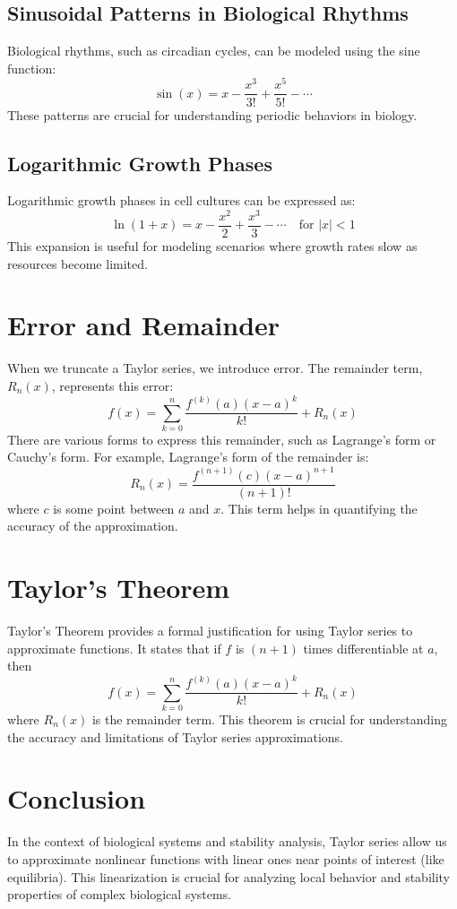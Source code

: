 \documentclass{article}
\begin{document}
\subsection{Sinusoidal Patterns in Biological Rhythms}
Biological rhythms, such as circadian cycles, can be modeled using the sine function:
\begin{equation}
\sin(x) = x - \frac{x^3}{3!} + \frac{x^5}{5!} - \cdots
\end{equation}
These patterns are crucial for understanding periodic behaviors in biology.

\subsection{Logarithmic Growth Phases}
Logarithmic growth phases in cell cultures can be expressed as:
\begin{equation}
\ln(1+x) = x - \frac{x^2}{2} + \frac{x^3}{3} - \cdots \quad \text{for } |x| < 1
\end{equation}
This expansion is useful for modeling scenarios where growth rates slow as resources become limited.

\section{Error and Remainder}
When we truncate a Taylor series, we introduce error. The remainder term, $R_n(x)$, represents this error:
\begin{equation}
f(x) = \sum_{k=0}^{n} \frac{f^{(k)}(a)(x-a)^k}{k!} + R_n(x)
\end{equation}
There are various forms to express this remainder, such as Lagrange's form or Cauchy's form. For example, Lagrange's form of the remainder is:
\begin{equation}
R_n(x) = \frac{f^{(n+1)}(c)(x-a)^{n+1}}{(n+1)!}
\end{equation}
where $c$ is some point between $a$ and $x$. This term helps in quantifying the accuracy of the approximation.

\section{Taylor's Theorem}
Taylor's Theorem provides a formal justification for using Taylor series to approximate functions. It states that if $f$ is $(n+1)$ times differentiable at $a$, then
\begin{equation}
f(x) = \sum_{k=0}^{n} \frac{f^{(k)}(a)(x-a)^k}{k!} + R_n(x)
\end{equation}
where $R_n(x)$ is the remainder term. This theorem is crucial for understanding the accuracy and limitations of Taylor series approximations.

\section{Conclusion}
In the context of biological systems and stability analysis, Taylor series allow us to approximate nonlinear functions with linear ones near points of interest (like equilibria). This linearization is crucial for analyzing local behavior and stability properties of complex biological systems.
\end{document}
